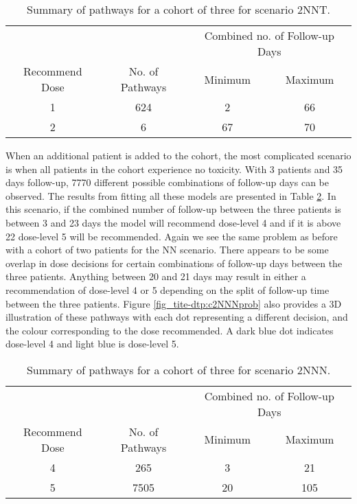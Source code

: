 \begin{table}[H]
	\centering
	\caption{Summary of pathways for a cohort of three for scenario 2NNT. }
	\label{tab_tite-dtp:TITEDTP_c3NNT}
	\begin{tabular}{cccc}
		\hline
		\multicolumn{1}{l}{} & \multicolumn{1}{l}{} & \multicolumn{2}{c}{Combined no. of Follow-up Days} \\ \cline{3-4} 
		Recommend Dose & No. of Pathways & Minimum & Maximum \\ \hline
		1              & 624             & 2       & 66      \\
		2              & 6               & 67      & 70      \\ \hline
	\end{tabular}
\end{table}

When an additional patient is added to the cohort, the most complicated scenario is when all patients in the cohort experience no toxicity. With 3 patients and 35 days follow-up, 7770 different possible combinations of follow-up days can be observed. The results from fitting all these models are presented in Table \ref{tab_tite-dtp:TITEDTP_c3NNN}. In this scenario, if the combined number of follow-up between the three patients is between 3 and 23 days the model will recommend dose-level 4 and if it is above 22 dose-level 5 will be recommended. Again we see the same problem as before with a cohort of two patients for the NN scenario. There appears to be some overlap in dose decisions for certain combinations of follow-up days between the three patients. Anything between 20 and 21 days may result in either a recommendation of dose-level 4 or 5 depending on the split of follow-up time between the three patients. Figure \ref{fig_tite-dtp:c2NNNprob} also provides a 3D illustration of these pathways with each dot representing a different decision, and the colour corresponding to the dose recommended. A dark blue dot indicates dose-level 4 and light blue is dose-level 5.  

\begin{table}[H]
	\centering
	\caption{Summary of pathways for a cohort of three for scenario 2NNN.}
	\label{tab_tite-dtp:TITEDTP_c3NNN}
	\begin{tabular}{cccc}
		\hline
		\multicolumn{1}{l}{} & \multicolumn{1}{l}{} & \multicolumn{2}{c}{Combined no. of Follow-up Days} \\ \cline{3-4} 
		Recommend Dose & No. of Pathways & Minimum & Maximum \\ \hline
		4              & 265             & 3       & 21      \\
		5              & 7505            & 20      & 105      \\ \hline
	\end{tabular}
\end{table}

